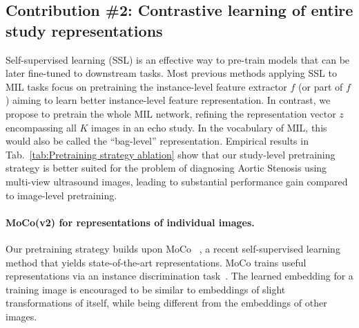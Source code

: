 \subsection{Contribution \#2: Contrastive learning of entire study representations}
\label{sec:methods_CL}

Self-supervised learning (SSL) is an effective way to pre-train models that can be later fine-tuned to downstream tasks. 
Most previous methods \citep{holste2022self, holste2022automated, liu2022multiple, lu2019semi, li2021dual, saillard2021self, dehaene2020self, rymarczyk2023protomil}  applying SSL to MIL tasks focus on pretraining the instance-level feature extractor $f$  (or part of $f$) aiming to learn better instance-level feature representation. %
In contrast, we propose to pretrain the whole MIL network, 
refining the representation vector $z$ encompassing all $K$ images in an echo study. In the vocabulary of MIL, this would also be called the ``bag-level'' representation.
Empirical results in Tab.~\ref{tab:Pretraining strategy ablation} show that our study-level pretraining strategy is better suited for the problem of diagnosing Aortic Stenosis using multi-view ultrasound images, leading to substantial performance gain compared to image-level pretraining.


\paragraph{MoCo(v2) for representations of individual images.}
Our pretraining strategy builds upon MoCo ~\citep{he2020momentum,chen2020improved}, a recent self-supervised learning method that yields state-of-the-art representations. 
MoCo trains useful representations via an instance discrimination task~\citep{wu2018unsupervised, ye2019unsupervised, bachman2019learning}. The learned embedding for a training image is encouraged to be similar to embeddings of slight transformations of itself, while being different from the embeddings of other images.

